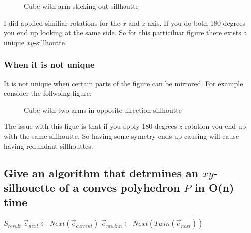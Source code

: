 \documentclass{article}
\begin{document}
\begin{empfile}
\begin{figure}
\caption{Cube with arm sticking out sillhoutte}
\end{figure}

I did applied similiar rotations for the $x$ and $z$ axis. If you
do both 180 degrees you end up looking at the same side. So for this
particiluar figure there exists a unique $xy$-sillhoutte.

\subsubsection{When it is not unique}

It is not unique when certain parts of the figure can be mirrored. For
example consider the follwoing figure:

\begin{figure}
\caption{Cube with two arms in opposite direction sillhoutte}
\end{figure}

The issue with this figue is that if you apply 180 degrees $z$ rotation you
end up with the same sillhoutte. So having some symetry ends up causing will
cause having redundant sillhouttes.

\subsection{Give an algorithm that detrmines an $xy$-silhouette of a conves polyhedron $P$ in O(n) time}

\begin{algorithmic}
		\State \Return $S_{result}$
	\EndIf
	\State
	$\vec{e}_{next} \gets Next(\vec{e}_{current})$
	\State
	$\vec{e}_{ntwinn} \gets Next(Twin(\vec{e}_{next}))$


\end{algorithmic}
\end{empfile}
\end{document}
